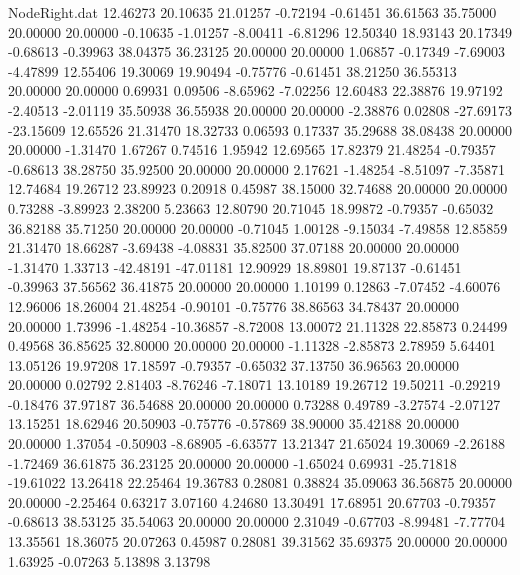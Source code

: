 \begin{filecontents}{NodeRight.dat}
  12.46273   20.10635   21.01257    -0.72194   -0.61451   36.61563   35.75000   20.00000   20.00000   -0.10635   -1.01257   -8.00411   -6.81296
  12.50340   18.93143   20.17349    -0.68613   -0.39963   38.04375   36.23125   20.00000   20.00000    1.06857   -0.17349   -7.69003   -4.47899
  12.55406   19.30069   19.90494    -0.75776   -0.61451   38.21250   36.55313   20.00000   20.00000    0.69931    0.09506   -8.65962   -7.02256
  12.60483   22.38876   19.97192    -2.40513   -2.01119   35.50938   36.55938   20.00000   20.00000   -2.38876    0.02808  -27.69173  -23.15609
  12.65526   21.31470   18.32733     0.06593    0.17337   35.29688   38.08438   20.00000   20.00000   -1.31470    1.67267    0.74516    1.95942
  12.69565   17.82379   21.48254    -0.79357   -0.68613   38.28750   35.92500   20.00000   20.00000    2.17621   -1.48254   -8.51097   -7.35871
  12.74684   19.26712   23.89923     0.20918    0.45987   38.15000   32.74688   20.00000   20.00000    0.73288   -3.89923    2.38200    5.23663
  12.80790   20.71045   18.99872    -0.79357   -0.65032   36.82188   35.71250   20.00000   20.00000   -0.71045    1.00128   -9.15034   -7.49858
  12.85859   21.31470   18.66287    -3.69438   -4.08831   35.82500   37.07188   20.00000   20.00000   -1.31470    1.33713  -42.48191  -47.01181
  12.90929   18.89801   19.87137    -0.61451   -0.39963   37.56562   36.41875   20.00000   20.00000    1.10199    0.12863   -7.07452   -4.60076
  12.96006   18.26004   21.48254    -0.90101   -0.75776   38.86563   34.78437   20.00000   20.00000    1.73996   -1.48254  -10.36857   -8.72008
  13.00072   21.11328   22.85873     0.24499    0.49568   36.85625   32.80000   20.00000   20.00000   -1.11328   -2.85873    2.78959    5.64401
  13.05126   19.97208   17.18597    -0.79357   -0.65032   37.13750   36.96563   20.00000   20.00000    0.02792    2.81403   -8.76246   -7.18071
  13.10189   19.26712   19.50211    -0.29219   -0.18476   37.97187   36.54688   20.00000   20.00000    0.73288    0.49789   -3.27574   -2.07127
  13.15251   18.62946   20.50903    -0.75776   -0.57869   38.90000   35.42188   20.00000   20.00000    1.37054   -0.50903   -8.68905   -6.63577
  13.21347   21.65024   19.30069    -2.26188   -1.72469   36.61875   36.23125   20.00000   20.00000   -1.65024    0.69931  -25.71818  -19.61022
  13.26418   22.25464   19.36783     0.28081    0.38824   35.09063   36.56875   20.00000   20.00000   -2.25464    0.63217    3.07160    4.24680
  13.30491   17.68951   20.67703    -0.79357   -0.68613   38.53125   35.54063   20.00000   20.00000    2.31049   -0.67703   -8.99481   -7.77704
  13.35561   18.36075   20.07263     0.45987    0.28081   39.31562   35.69375   20.00000   20.00000    1.63925   -0.07263    5.13898    3.13798

\end{filecontents}
